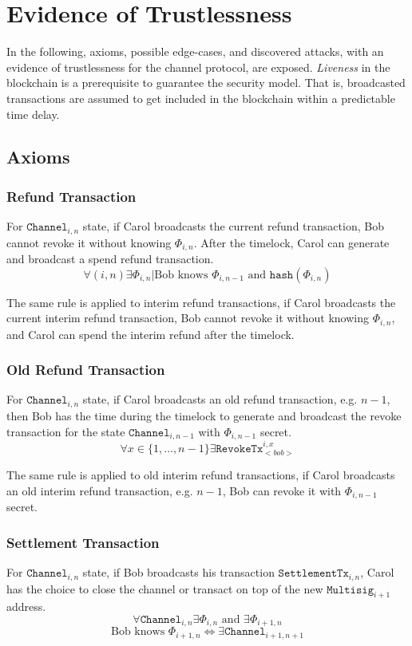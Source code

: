 \documentclass{llncs}
\begin{document}
\section{Evidence of Trustlessness} In the following, axioms, possible
edge-cases, and discovered attacks, with an evidence of trustlessness for the
channel protocol, are exposed. \textit{Liveness} in the blockchain is a
prerequisite to guarantee the security model. That is, broadcasted transactions
are assumed to get included in the blockchain within a predictable time delay.

\subsection{Axioms}

\subsubsection{Refund Transaction} For $\texttt{Channel}_{i,n}$ state, if Carol
broadcasts the current refund transaction, Bob cannot revoke it without knowing
$\Phi_{i,n}$. After the timelock, Carol can generate and broadcast a spend
refund transaction.
\[ \forall (i,n) \exists \Phi_{i,n} | \text{Bob knows } \Phi_{i,n-1}
\text{ and } \texttt{hash} ( \Phi_{i,n} )
\]

The same rule is applied to interim refund transactions, if Carol broadcasts the
current interim refund transaction, Bob cannot revoke it without knowing
$\Phi_{i,n}$, and Carol can spend the interim refund after the timelock.

\subsubsection{Old Refund Transaction} For $\texttt{Channel}_{i,n}$ state, if
Carol broadcasts an old refund transaction, e.g. $n-1$, then Bob has the time
during the timelock to generate and broadcast the revoke transaction for the
state $\texttt{Channel}_{i,n-1}$ with $\Phi_{i,n-1}$ secret.
\[ \forall x \in \{1,\dots,n-1\} \exists \texttt{RevokeTx}_{<bob>}^{i,x}
\]

The same rule is applied to old interim refund transactions, if Carol broadcasts
an old interim refund transaction, e.g. $n-1$, Bob can revoke it with
$\Phi_{i,n-1}$ secret.

\subsubsection{Settlement Transaction} For $\texttt{Channel}_{i,n}$ state, if
Bob broadcasts his transaction $\texttt{SettlementTx}_{i,n}$, Carol has the
choice to close the channel or transact on top of the new
$\texttt{Multisig}_{i+1}$ address.
\[ \forall \texttt{Channel}_{i,n} \exists \Phi_{i,n} \text{ and } \exists
\Phi_{i+1,n}
\]
\[ \text{Bob knows } \Phi_{i+1,n} \iff \exists\texttt{Channel}_{i+1,n+1}
\]
\end{document}
